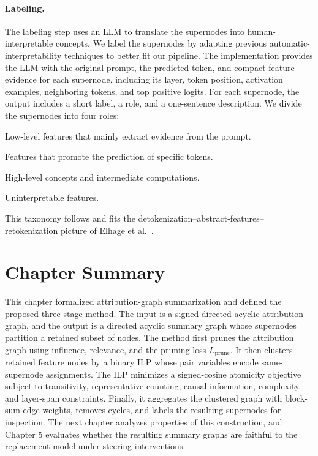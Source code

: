 \documentclass[../main.tex]{subfiles}
\begin{document}
\paragraph{Labeling.}
The labeling step uses an LLM to translate the supernodes into human-interpretable concepts.
We label the supernodes by adapting previous automatic-interpretability techniques \cite{bills2023language} to better fit our pipeline.
The implementation provides the LLM with the original prompt, the predicted token, and compact
feature evidence for each supernode, including its layer, token position, activation
examples, neighboring tokens, and top positive logits. For each supernode, the output includes a short label, a role, and a one-sentence description.
We divide the supernodes into four roles:
\begin{description}[leftmargin=2.0em,style=nextline,topsep=2pt,itemsep=3pt]
\item[Input.] Low-level features that mainly extract evidence from the prompt.
\item[Output.] Features that promote the prediction of specific tokens.
\item[Abstract.] High-level concepts and intermediate computations.
\item[Trash.] Uninterpretable features.
\end{description}

This taxonomy follows \cite{lindsey2025biology} and fits the detokenization--abstract-features--retokenization picture of Elhage et al.~\cite{elhage2022solu}.
\section{Chapter Summary}

This chapter formalized attribution-graph summarization and defined the proposed
three-stage method. The input is a signed directed acyclic attribution graph, and
the output is a directed acyclic summary graph whose supernodes partition a
retained subset of nodes. The method first prunes the attribution graph
using influence, relevance, and the pruning loss $L_{\text{prune}}$. It then
clusters retained feature nodes by a binary ILP whose pair variables encode
same-supernode assignments. The ILP minimizes a signed-cosine atomicity objective
subject to transitivity, representative-counting, causal-information, complexity,
and layer-span constraints. Finally, it aggregates the clustered graph with
block-sum edge weights, removes cycles, and labels the resulting supernodes for
inspection. The next chapter analyzes properties of this construction, and Chapter
5 evaluates whether the resulting summary graphs are faithful to the replacement
model under steering interventions.
\end{document}
